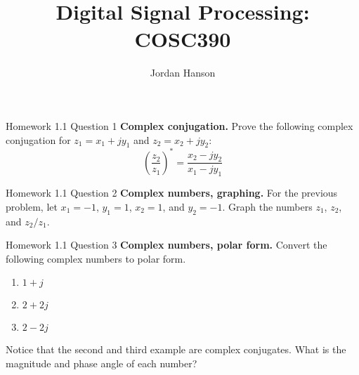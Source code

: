 \documentclass{beamer}
\title{Digital Signal Processing: COSC390}
\author{Jordan Hanson}
\institute{Whittier College Department of Physics and Astronomy}
\begin{document}
\maketitle

\begin{frame}{Homework 1.1 Question 1}
\textbf{Complex conjugation.}  Prove the following complex conjugation for $z_1 = x_1 + j y_1$ and $z_2 = x_2 + j y_2$:
\begin{equation}
\left(\frac{z_2}{z_1}\right)^* = \frac{x_2 - j y_2}{x_1 - j y_1}
\end{equation}
\end{frame}

\begin{frame}{Homework 1.1 Question 2}
\textbf{Complex numbers, graphing.}  For the previous problem, let $x_1 = -1$, $y_1 = 1$, $x_2 = 1$, and $y_2 = -1$.  Graph the numbers $z_1$, $z_2$, and $z_2/z_1$.
\end{frame}

\begin{frame}{Homework 1.1 Question 3}
\textbf{Complex numbers, polar form.} Convert the following complex numbers to polar form.
\begin{enumerate}
\item $ 1+j$
\item $2 + 2j$
\item $2 - 2j$
\end{enumerate}
Notice that the second and third example are complex conjugates.  What is the magnitude and phase angle of each number?
\end{frame}
\end{document}
